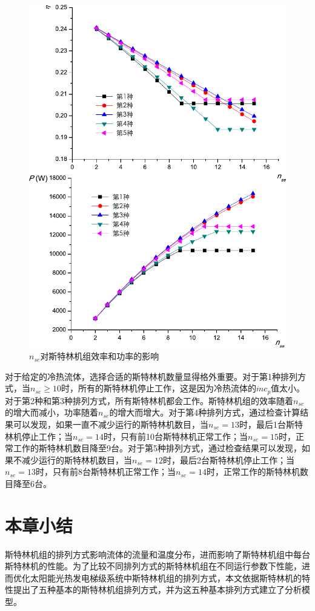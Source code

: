 \noindent \begin{figure}[htbp]
\begin{center}
	\includegraphics[width = 0.7\columnwidth]{fig/n_se}
	\caption{$n_{se}$对斯特林机组效率和功率的影响}
	\label{fig:n_se}
\end{center}
\end{figure}

对于给定的冷热流体，选择合适的斯特林机数量显得格外重要。对于第1种排列方式，当$n_{se} \geqslant 10$时，所有的斯特林机停止工作，这是因为冷热流体的$\dot{m}c_p$值太小。对于第2种和第3种排列方式，所有斯特林机都会工作。斯特林机组的效率随着$n_{se}$的增大而减小，功率随着$n_{se}$的增大而增大。对于第4种排列方式，通过检查计算结果可以发现，如果一直不减少运行的斯特林机数目，当$n_{se} = 13$时，最后1台斯特林机停止工作；当$n_{se} = 14$时，只有前10台斯特林机正常工作；当$n_{se} = 15$时，正常工作的斯特林机数目降至9台。对于第5种排列方式，通过检查结果可以发现，如果不减少运行的斯特林机数目，当$n_{se} = 12$时，最后2台斯特林机停止工作；当$n_{se} = 13$时，只有前8台斯特林机正常工作；当$n_{se} = 14$时，正常工作的斯特林机数目降至6台。

\section{本章小结}

斯特林机组的排列方式影响流体的流量和温度分布，进而影响了斯特林机组中每台斯特林机的性能。为了比较不同排列方式的斯特林机组在不同运行参数下性能，进而优化太阳能光热发电梯级系统中斯特林机组的排列方式，本文依据斯特林机的特性提出了五种基本的斯特林机组排列方式，并为这五种基本排列方式建立了分析模型。

